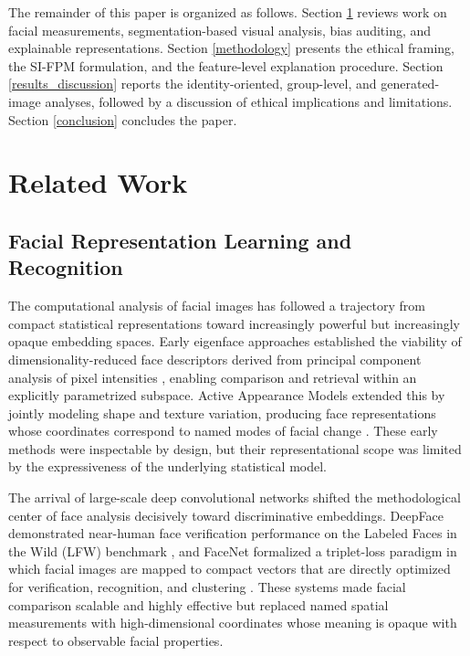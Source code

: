\documentclass{article}
\begin{document}
The remainder of this paper is organized as follows. Section \ref{related_work} reviews work on facial measurements, segmentation-based visual analysis, bias auditing, and explainable representations. Section \ref{methodology} presents the ethical framing, the SI-FPM formulation, and the feature-level explanation procedure. Section \ref{results_discussion} reports the identity-oriented, group-level, and generated-image analyses, followed by a discussion of ethical implications and limitations. Section \ref{conclusion} concludes the paper.


\section{Related Work}
\label{related_work}

\subsection{Facial Representation Learning and Recognition}

The computational analysis of facial images has followed a trajectory from compact statistical representations toward increasingly powerful but increasingly opaque embedding spaces. Early eigenface approaches established the viability of dimensionality-reduced face descriptors derived from principal component analysis of pixel intensities \cite{turk1991eigenfaces}, enabling comparison and retrieval within an explicitly parametrized subspace. Active Appearance Models extended this by jointly modeling shape and texture variation, producing face representations whose coordinates correspond to named modes of facial change \cite{cootes2001aam}. These early methods were inspectable by design, but their representational scope was limited by the expressiveness of the underlying statistical model.

The arrival of large-scale deep convolutional networks shifted the methodological center of face analysis decisively toward discriminative embeddings. DeepFace demonstrated near-human face verification performance on the Labeled Faces in the Wild (LFW) benchmark \cite{taigman2014deepface,huang2008labeled}, and FaceNet formalized a triplet-loss paradigm in which facial images are mapped to compact vectors that are directly optimized for verification, recognition, and clustering \cite{schroff2015facenet}. These systems made facial comparison scalable and highly effective but replaced named spatial measurements with high-dimensional coordinates whose meaning is opaque with respect to observable facial properties.
\end{document}
